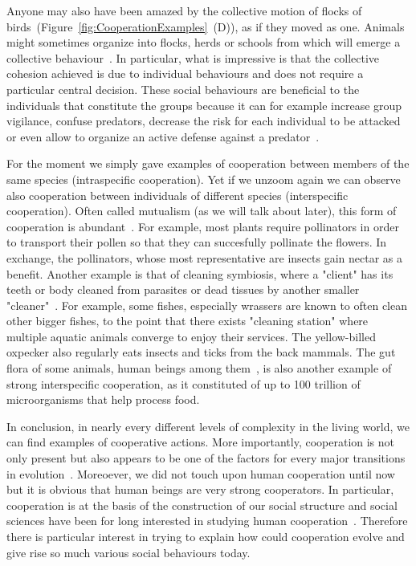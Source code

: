     Anyone may also have been amazed by the collective motion of flocks of birds~(Figure~\ref{fig:CooperationExamples}~(D)), as if they moved as one. Animals might sometimes organize into flocks, herds or schools from which will emerge a collective behaviour~\parencite{Couzin2002, Couzin2003}. In particular, what is impressive is that the collective cohesion achieved is due to individual behaviours and does not require a particular central decision. These social behaviours are beneficial to the individuals that constitute the groups because it can for example increase group vigilance, confuse predators, decrease the risk for each individual to be attacked or even allow to organize an active defense against a predator~\parencite{Hamilton1971, Olson2013}.

    For the moment we simply gave examples of cooperation between members of the same species (intraspecific cooperation). Yet if we unzoom again we can observe also cooperation between individuals of different species (interspecific cooperation). Often called mutualism (as we will talk about later), this form of cooperation is abundant~\parencite{Bshary2004}. For example, most plants require pollinators in order to transport their pollen so that they can succesfully pollinate the flowers. In exchange, the pollinators, whose most representative are insects gain nectar as a benefit. Another example is that of cleaning symbiosis, where a "client" has its teeth or body cleaned from parasites or dead tissues by another smaller "cleaner"~\parencite{Poulin1996}. For example, some fishes, especially wrassers are known to often clean other bigger fishes, to the point that there exists "cleaning station" where multiple aquatic animals converge to enjoy their services. The yellow-billed oxpecker also regularly eats insects and ticks from the back mammals. The gut flora of some animals, human beings among them~\parencite{Backhed2005}, is also another example of strong interspecific cooperation, as it constituted of up to 100 trillion of microorganisms that help process food.



    In conclusion, in nearly every different levels of complexity in the living world, we can find examples of cooperative actions. More importantly, cooperation is not only present but also appears to be one of the factors for every major transitions in evolution~\parencite{Szathmary1995}. Moreoever, we did not touch upon human cooperation until now but it is obvious that human beings are very strong cooperators. In particular, cooperation is at the basis of the construction of our social structure and social sciences have been for long interested in studying human cooperation~\parencite{West2011a}. Therefore there is particular interest in trying to explain how could cooperation evolve and give rise so much various social behaviours today. 


